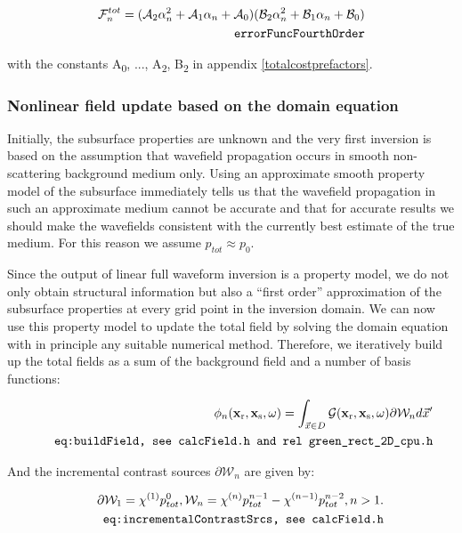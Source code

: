 \documentclass[10pt,a4paper]{article}
\begin{document}
\begin{align} \label{eq:errorFuncFourthOrder} \mathcal{F}^{tot}_n =
(\mathcal{A}_2\alpha^{2}_n + \mathcal{A}_1\alpha_n
+\mathcal{A}_0)(\mathcal{B}_2\alpha^{2}_n + \mathcal{B}_1\alpha_n +
\mathcal{B}_0)\\
\tag*{\texttt{errorFuncFourthOrder}}
\end{align}

with the constants A\textsubscript{0}, ...,
A\textsubscript{2}, B\textsubscript{2} in appendix
\ref{totalcostprefactors}.

\subsubsection{Nonlinear field update based on the domain equation}
\label{nonlinfupdate}
Initially, the subsurface properties are unknown  and the very first
inversion is based on the assumption that wavefield propagation occurs
in smooth non-scattering background medium only.
Using an approximate smooth property model of the subsurface
immediately tells us that the wavefield propagation in such an
approximate medium cannot be accurate and that for accurate
results we should make the wavefields consistent with the currently
best estimate of the true medium. For this reason we assume $p_{tot}
\approx p_0$.

Since the output of linear full waveform inversion is a property model, we do
not only obtain structural information but also a ``first order''
approximation of the
subsurface properties at every grid point in the inversion domain. We
can now use this property model to update the total field by solving
the domain equation with in principle any suitable numerical method.
Therefore, we iteratively build up the total fields as a sum of the
background field and a number of basis functions:

\begin{align} \label{eq:buildField} \phi_n
(\mathbf{x_\text{r}},\mathbf{x_\text{s}},\omega) = \int_{\vec{x}\in D}
\mathcal{G} (\mathbf{x_\text{r}},\mathbf{x_\text{s}},\omega)\partial
\mathcal{W}_n d\vec{x}' \\
\tag*{\texttt{eq:buildField, see calcField.h and rel green\_rect\_2D\_cpu.h}}
\end{align}

And the incremental contrast sources $\partial \mathcal{W}_n$ are given by:

\begin{align} \label{eq:incrementalContrastSrcs} \partial \mathcal{W}_1 = \chi^{(1)}
p^{0}_{tot} , \mathcal{W}_n = \chi^{(n)} p^{n-1}_{tot} - \chi^{(n-1)}
p^{n-2}_{tot}, n > 1.\\
\tag*{\texttt{eq:incrementalContrastSrcs, see calcField.h}}
\end{align}
\end{document}
